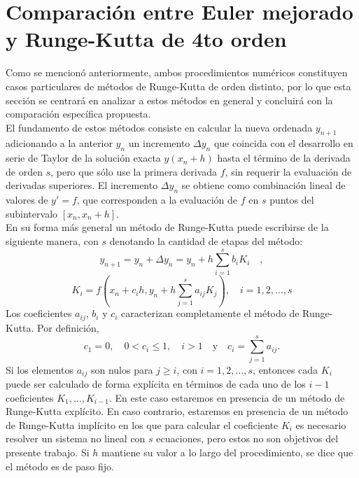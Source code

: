 \documentclass[a4paper,12pt]{article}
\begin{document}
\section{Comparación entre Euler mejorado y Runge-Kutta de 4to orden} 
Como se mencionó anteriormente, ambos procedimientos numéricos constituyen casos particulares de métodos de Runge-Kutta de orden distinto, por lo que esta sección se centrará en analizar a estos métodos en general y concluirá con la comparación específica propuesta.\\
El fundamento de estos métodos consiste en calcular la nueva ordenada \(y_{n+1}\) adicionando a la anterior \(y_n\) un incremento \(\Delta y_n\) que coincida con el desarrollo en serie de Taylor de la solución exacta \(y(x_n + h)\) hasta el término de la derivada de orden \(s\), pero que sólo use la primera derivada \(f\), sin requerir la evaluación de derivadas superiores. El incremento \(\Delta y_n\) se obtiene como combinación lineal de valores de \(y' = f\), que corresponden a la evaluación de \(f\) en \(s\) puntos del subintervalo \([x_n, x_n + h]\).\\
En su forma más general un método de Runge-Kutta puede escribirse de la siguiente manera, con \(s\) denotando la cantidad de etapas del método:
\begin{equation} 
y_{n+1} = y_n + \Delta y_n = y_n + h \sum_{i=1}^{s} b_i K_i \quad ,
\end{equation} 
\begin{equation} K_i = f \left( x_n + c_i h, y_n + h \sum_{j=1}^{s} a_{ij} K_j \right) , \quad i = 1, 2, \ldots, s 
\end{equation}
Los coeficientes \(a_{ij}\), \(b_i\) y \(c_i\) caracterizan completamente el método de Runge-Kutta. Por definición, 
\begin{equation}
c_1 = 0, \quad 0 < c_i \leq 1, \quad i > 1 \quad \text{y} \quad c_i = \sum_{j=1}^{s} a_{ij}.
\end{equation}
Si los elementos \(a_{ij}\) son nulos para \(j \geq i\), con \(i = 1, 2, \ldots, s\), entonces cada \(K_i\) puede ser calculado de forma explícita en términos de cada uno de los \(i-1\) coeficientes \(K_1, \ldots, K_{i-1}\). En este caso estaremos en presencia de un método de Runge-Kutta explícito. En caso contrario, estaremos en presencia de un método de Runge-Kutta implícito en los que para calcular el coeficiente \(K_i\) es necesario resolver un sistema no lineal con \(s\) ecuaciones, pero estos no son objetivos del presente trabajo. Si \(h\) mantiene su valor a lo largo del procedimiento, se dice que el método es de paso fijo.\\
\end{document}
